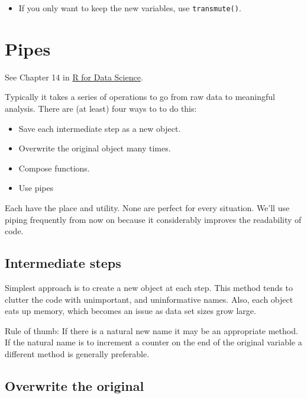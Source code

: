 \documentclass[]{book}
\providecommand{\tightlist}{%
  \setlength{\itemsep}{0pt}\setlength{\parskip}{0pt}}
\newenvironment{rmdblock}[1]
  {\begin{shaded*}
  \begin{itemize}
  \renewcommand{\labelitemi}{
    \raisebox{-.7\height}[0pt][0pt]{
      {\setkeys{Gin}{width=3em,keepaspectratio}\texttt{[image: images/\#1]}}
    }
  }
  \item
  }
  {
  \end{itemize}
  \end{shaded*}
  }
\newenvironment{rmdtip}
  {\begin{rmdblock}{tip}}
  {\end{rmdblock}}
\theoremstyle{definition}
\theoremstyle{definition}
\theoremstyle{definition}
\theoremstyle{remark}
\let\BeginKnitrBlock\begin \let\EndKnitrBlock\end
\begin{document}
\begin{rmdtip}
If you only want to keep the new variables, use \texttt{transmute()}.
\end{rmdtip}

\hypertarget{pipes}{%
\section{Pipes}\label{pipes}}

\BeginKnitrBlock{rmdimportant}
See Chapter 14 in \href{http://r4ds.had.co.nz/pipes.html}{R for Data
Science}.
\EndKnitrBlock{rmdimportant}

Typically it takes a series of operations to go from raw data to
meaningful analysis. There are (at least) four ways to to do this:

\begin{itemize}
\tightlist
\item
  Save each intermediate step as a new object.
\item
  Overwrite the original object many times.
\item
  Compose functions.
\item
  Use pipes
\end{itemize}

Each have the place and utility. None are perfect for every situation.
We'll use piping frequently from now on because it considerably improves
the readability of code.

\hypertarget{intermediate-steps}{%
\subsection{Intermediate steps}\label{intermediate-steps}}

Simplest approach is to create a new object at each step. This method
tends to clutter the code with unimportant, and uninformative names.
Also, each object eats up memory, which becomes an issue as data set
sizes grow large.

Rule of thumb: If there is a natural new name it may be an appropriate
method. If the natural name is to increment a counter on the end of the
original variable a different method is generally preferable.

\hypertarget{overwrite-the-original}{%
\subsection{Overwrite the original}\label{overwrite-the-original}}
\end{document}
